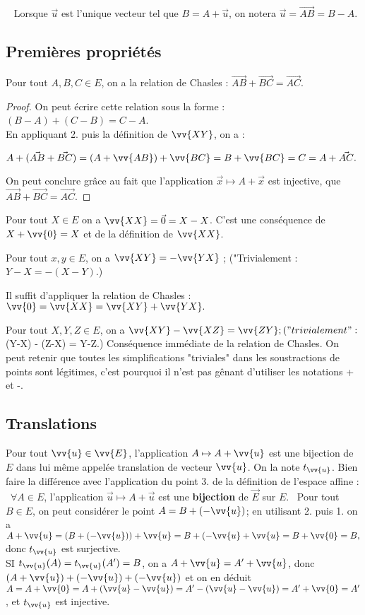 \documentclass{../../tete}
\begin{document}
\noindent \dag ~ Lorsque $\vec{u}$ est l'unique vecteur tel que $B = A + \vec{u}$, on notera $\vec{u} = \vec{AB} = B - A$.

\subsection{Premières propriétés}
\bp
Pour tout $A,B,C \in E$, on a la relation de Chasles : $\vec{AB}+\vec{BC} = \vec{AC}$.
\ep
\begin{proof}
On peut écrire cette relation sous la forme : $(B-A) + (C - B) = C -A$.\\
En appliquant 2. puis la définition de $\vv{XY}$, on a :
\ben
\item $A + (\vec{AB} + \vec{BC}) = (A + \vv{AB}) + \vv{BC} = B + \vv{BC} = C = A+ \vec{AC}.$
\item On peut conclure grâce au fait que l'application $\vec{x} \mapsto A + \vec{x}$ est injective, que $\vec{AB}+\vec{BC} = \vec{AC}$.
\een
\end{proof}

\bp
Pour tout $X \in E$ on a $\vv{XX} = \vec{0} = X - X$.
\ep
\bpf
C'est une conséquence de $X+\vv{0} = X$ et de la définition de $\vv{XX}$.
\epf

\bp
Pour tout $x,y \in E$, on a $\vv{XY} = - \vv{YX}$ ; ("Trivialement : $Y-X = -(X-Y)$.)
\ep

\bpf
Il suffit d'appliquer la relation de Chasles : $\vv{0} = \vv{XX} = \vv{XY} + \vv{YX}.$
\epf

\bp
Pour tout $X, Y, Z \in E$, on a $\vv{XY} - \vv{XZ} = \vv{ZY} ; ("trivialement" : $(Y-X) - (Z-X) = Y-Z.)
\ep
\bpf
Conséquence immédiate de la relation de Chasles.
\epf
\bn
 On peut retenir que toutes les simplifications "triviales" dans les soustractions de points sont légitimes, c'est pourquoi il n'est pas gênant d'utiliser les notations + et -.
\en

\subsection{Translations}
\bp
Pour tout $\vv{u} \in \vv{E}$, l'application $A \mapsto A + \vv{u}$ est une bijection de $E$ dans lui même appelée translation de vecteur $\vv{u}$. On la note $t_{\vv{u}}$.
\ep
\bw
Bien faire la différence avec l'application du point 3. de la définition de l'espace affine : ~$\forall A \in E$, l'application $\vec{u} \mapsto A + \vec{u}$ est une \textbf{bijection} de $\vec{E}$ sur $E$.~
\ew
\bpf
Pour tout $B \in E$, on peut considérer le point $A = B + (-\vv{u})$; en utilisant 2. puis 1. on a $A+ \vv{u} = (B + (-\vv{u})) + \vv{u} = B + (-\vv{u} + \vv{u} = B + \vv{0} = B,$ donc $t_{\vv{u}}$ est surjective.\\
SI $t_{\vv{u}}(A) = t_{\vv{u}}(A') = B$, on a $A + \vv{u} = A' + \vv{u}$, donc $(A + \vv{u}) + (-\vv{u}) + (-\vv{u})$ et on en déduit $A = A + \vv{0} = A + (\vv{u} - \vv{u}) = A' - (\vv{u} - \vv{u}) = A' + \vv{0} = A'$, et $t_{\vv{u}}$ est injective.
\epf
\end{document}
